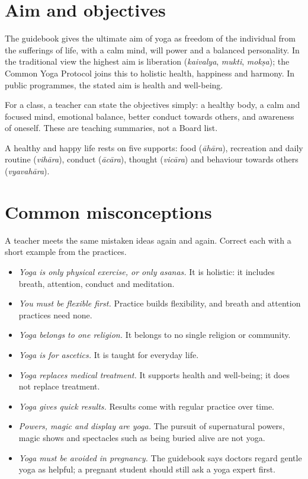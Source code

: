 \section{Aim and objectives}

The guidebook gives the ultimate aim of yoga as freedom of the individual from the sufferings of life, with a calm mind, will power and a balanced personality. In the traditional view the highest aim is liberation (\emph{kaivalya}, \emph{mukti}, \emph{mokṣa}); the Common Yoga Protocol joins this to holistic health, happiness and harmony. In public programmes, the stated aim is health and well-being.

For a class, a teacher can state the objectives simply: a healthy body, a calm and focused mind, emotional balance, better conduct towards others, and awareness of oneself. These are teaching summaries, not a Board list.

A healthy and happy life rests on five supports: food (\emph{āhāra}), recreation and daily routine (\emph{vihāra}), conduct (\emph{ācāra}), thought (\emph{vicāra}) and behaviour towards others (\emph{vyavahāra}).

\section{Common misconceptions}

A teacher meets the same mistaken ideas again and again. Correct each with a short example from the practices.
\begin{itemize}
\item \emph{Yoga is only physical exercise, or only asanas.} It is holistic: it includes breath, attention, conduct and meditation.
\item \emph{You must be flexible first.} Practice builds flexibility, and breath and attention practices need none.
\item \emph{Yoga belongs to one religion.} It belongs to no single religion or community.
\item \emph{Yoga is for ascetics.} It is taught for everyday life.
\item \emph{Yoga replaces medical treatment.} It supports health and well-being; it does not replace treatment.
\item \emph{Yoga gives quick results.} Results come with regular practice over time.
\item \emph{Powers, magic and display are yoga.} The pursuit of supernatural powers, magic shows and spectacles such as being buried alive are not yoga.
\item \emph{Yoga must be avoided in pregnancy.} The guidebook says doctors regard gentle yoga as helpful; a pregnant student should still ask a yoga expert first.
\end{itemize}

